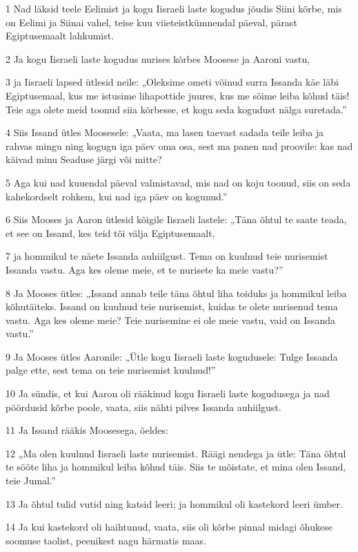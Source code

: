 \par 1 Nad läksid teele Eelimist ja kogu Iisraeli laste kogudus jõudis Siini kõrbe, mis on Eelimi ja Siinai vahel, teise kuu viieteistkümnendal päeval, pärast Egiptusemaalt lahkumist.
\par 2 Ja kogu Iisraeli laste kogudus nurises kõrbes Moosese ja Aaroni vastu,
\par 3 ja Iisraeli lapsed ütlesid neile: „Oleksime ometi võinud surra Issanda käe läbi Egiptusemaal, kus me istusime lihapottide juures, kus me sõime leiba kõhud täis! Teie aga olete meid toonud siia kõrbesse, et kogu seda kogudust nälga suretada.”
\par 4 Siis Issand ütles Moosesele: „Vaata, ma lasen taevast sadada teile leiba ja rahvas mingu ning kogugu iga päev oma osa, sest ma panen nad proovile: kas nad käivad minu Seaduse järgi või mitte?
\par 5 Aga kui nad kuuendal päeval valmistavad, mis nad on koju toonud, siis on seda kahekordselt rohkem, kui nad iga päev on kogunud.”
\par 6 Siis Mooses ja Aaron ütlesid kõigile Iisraeli lastele: „Täna õhtul te saate teada, et see on Issand, kes teid tõi välja Egiptusemaalt,
\par 7 ja hommikul te näete Issanda auhiilgust. Tema on kuulnud teie nurisemist Issanda vastu. Aga kes oleme meie, et te nurisete ka meie vastu?”
\par 8 Ja Mooses ütles: „Issand annab teile täna õhtul liha toiduks ja hommikul leiba kõhutäiteks. Issand on kuulnud teie nurisemist, kuidas te olete nurisenud tema vastu. Aga kes oleme meie? Teie nurisemine ei ole meie vastu, vaid on Issanda vastu.”
\par 9 Ja Mooses ütles Aaronile: „Ütle kogu Iisraeli laste kogudusele: Tulge Issanda palge ette, sest tema on teie nurisemist kuulnud!”
\par 10 Ja sündis, et kui Aaron oli rääkinud kogu Iisraeli laste kogudusega ja nad pöördusid kõrbe poole, vaata, siis nähti pilves Issanda auhiilgust.
\par 11 Ja Issand rääkis Moosesega, öeldes:
\par 12 „Ma olen kuulnud Iisraeli laste nurisemist. Räägi nendega ja ütle: Täna õhtul te sööte liha ja hommikul leiba kõhud täis. Siis te mõistate, et mina olen Issand, teie Jumal.”
\par 13 Ja õhtul tulid vutid ning katsid leeri; ja hommikul oli kastekord leeri ümber.
\par 14 Ja kui kastekord oli haihtunud, vaata, siis oli kõrbe pinnal midagi õhukese soomuse taolist, peenikest nagu härmatis maas.
